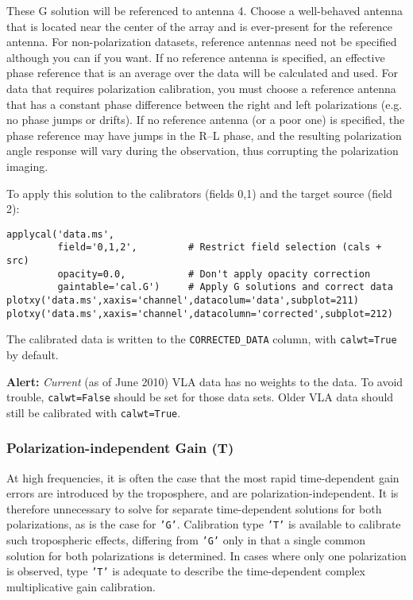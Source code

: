 These G solution will be referenced to antenna 4.  Choose a
well-behaved antenna that is located near the center of the array and
is ever-present for the reference antenna.  For non-polarization
datasets, reference antennas need not be specified although you can if
you want.  If no reference antenna is specified, an effective phase
reference that is an average over the data will be calculated and
used.  For data that requires polarization calibration, you must
choose a reference antenna that has a constant phase difference
between the right and left polarizations (e.g. no phase jumps or
drifts).  If no reference antenna (or a poor one) is specified, the
phase reference may have jumps in the R--L phase, and the resulting
polarization angle response will vary during the observation, thus
corrupting the polarization imaging.

To apply this solution to the calibrators (fields 0,1) and the target source (field
2):
\small
\begin{verbatim}
applycal('data.ms',
         field='0,1,2',         # Restrict field selection (cals + src)
         opacity=0.0,           # Don't apply opacity correction
         gaintable='cal.G')     # Apply G solutions and correct data
plotxy('data.ms',xaxis='channel',datacolum='data',subplot=211)
plotxy('data.ms',xaxis='channel',datacolumn='corrected',subplot=212)
\end{verbatim}
\normalsize
The calibrated data is written to the {\tt CORRECTED\_DATA} column, with 
{\tt calwt=True} by default.

{\bf Alert:} {\it Current} (as of June 2010)  VLA data has no weights
to the data. To avoid trouble, {\tt calwt=False} should be set for
those data sets. Older VLA data should still be calibrated with  {\tt calwt=True}.

\subsubsection{Polarization-independent Gain (T)}
\label{section:cal.solve.gain.t}

At high frequencies, it is often the case that the most rapid
time-dependent gain errors are introduced by the troposphere, and are
polarization-independent.  It is therefore unnecessary to solve for
separate time-dependent solutions for both polarizations, as is the
case for {\tt 'G'}.  Calibration type {\tt 'T'} is available to calibrate such
tropospheric effects, differing from {\tt 'G'} only in that a single common
solution for both polarizations is determined.  In cases where only
one polarization is observed, type {\tt 'T'} is adequate to describe the
time-dependent complex multiplicative gain calibration.

